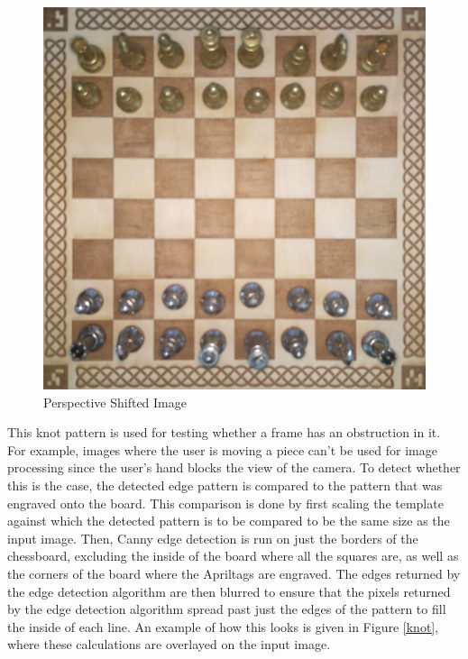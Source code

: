 \documentclass[journal]{IEEEtran}
\begin{document}
\begin{figure}[!ht]
	\centering
	\includegraphics[width=\linewidth]{Images/InputImage_KnotCrop.jpg}
	\caption{Perspective Shifted Image}
	\label{KnotCrop}
\end{figure}

This knot pattern is used for testing whether a frame has an obstruction in it. For example, images where the user is moving a piece can't be used for image processing since the user's hand blocks the view of the camera. 
To detect whether this is the case, the detected edge pattern is compared to the pattern that was engraved onto the board.
This comparison is done by first scaling the template against which the detected pattern is to be compared to be the same size as the input image. Then, Canny edge detection is run on just the borders of the chessboard, excluding the inside of the board where all the squares are, as well as the corners of the board where the Apriltags are engraved.
The edges returned by the edge detection algorithm are then blurred to ensure that the pixels returned by the edge detection algorithm spread past just the edges of the pattern to fill the inside of each line.
An example of how this looks is given in Figure \ref{knot}, where these calculations are overlayed on the input image.
\end{document}
